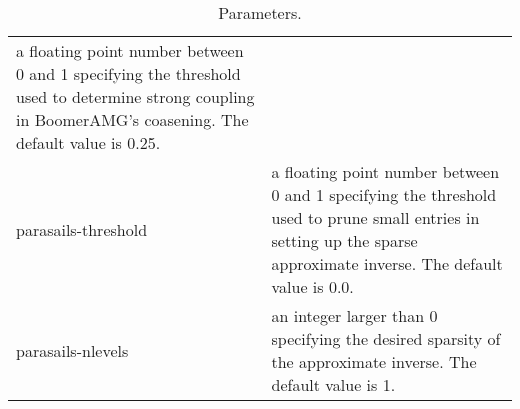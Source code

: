 \begin{table}[h]
\begin{tabular}{|l|p{4.5in}|}
a floating point number between 0 and 1 specifying the threshold used
to determine strong coupling in BoomerAMG's coasening.  The default
value is 0.25.
\\
parasails-threshold &
a floating point number between 0 and 1 specifying the threshold used
to prune small entries in setting up the sparse approximate inverse.
The default value is 0.0.
\\
parasails-nlevels &
an integer larger than 0 specifying the desired sparsity of the
approximate inverse.  The default value is 1.
\\
\hline
\end{tabular}
\caption{%
Parameters.
}
\label{table-fei-param}
\end{table}




%
